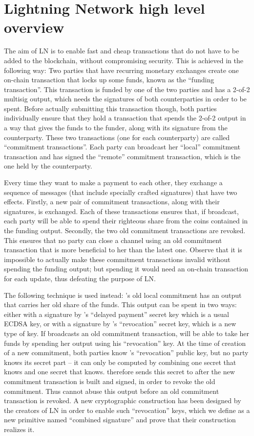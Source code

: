 \section{Lightning Network high level overview}
  The aim of LN is to enable fast and cheap transactions that do not have to be
  added to the blockchain, without compromising security. This is achieved in
  the following way: Two parties that have recurring monetary exchanges create
  one on-chain transaction that locks up some funds, known as the ``funding
  transaction''. This transaction is funded by one of the two parties and has a
  2-of-2 multisig output, which needs the signatures of both counterparties in
  order to be spent. Before actually submitting this transaction though, both
  parties individually ensure that they hold a transaction that spends the
  2-of-2 output in a way that gives the funds to the funder, along with its
  signature from the counterparty. These two transactions (one for each
  counterparty) are called ``commitment transactions''. Each party can broadcast
  her ``local'' commitment transaction and has signed the ``remote'' commitment
  transaction, which is the one held by the counterparty.

  Every time they want to make a payment to each other, they exchange a sequence
  of messages (that include specially crafted signatures) that have two effects.
  Firstly, a new pair of commitment transactions, along with their signatures,
  is exchanged. Each of these transactions ensures that, if broadcast, each
  party will be able to spend their righteous share from the coins contained in
  the funding output. Secondly, the two old commitment transactions are revoked.
  This ensures that no party can close a channel using an old commitment
  transaction that is more beneficial to her than the latest one. Observe that
  it is impossible to actually make these commitment transactions invalid
  without spending the funding output; but spending it would need an on-chain
  transaction for each update, thus defeating the purpose of LN.

  The following technique is used instead: \alice's old local commitment has an
  output that carries her old share of the funds. This output can be spent in
  two ways: either with a signature by \alice's ``delayed payment'' secret key
  which is a usual ECDSA key, or with a signature by \bob's ``revocation''
  secret key, which is a new type of key. If \alice{} broadcasts an old
  commitment transaction, \bob{} will be able to take her funds by spending her
  output using his ``revocation'' key. At the time of creation of a new
  commitment, both parties know \bob's ``revocation'' public key, but no party
  knows its secret part -- it can only be computed by combining one secret that
  \alice{} knows and one secret that \bob{} knows. \alice{} therefore sends this
  secret to \bob{} after the new commitment transaction is built and signed, in
  order to revoke the old commitment. Thus \bob{} cannot abuse this output
  before an old commitment transaction is revoked. A new cryptographic
  construction has been designed by the creators of LN in order to enable such
  ``revocation'' keys, which we define as a new primitive named ``combined
  signature'' and prove that their construction realizes it.

